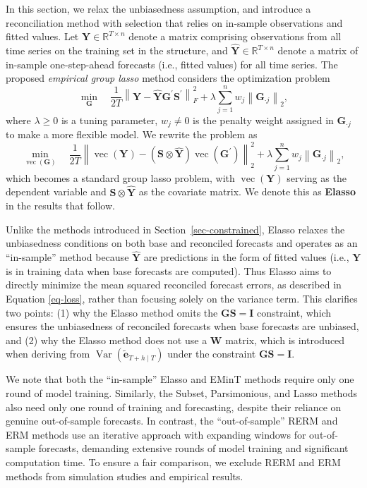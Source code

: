 \documentclass[
  11pt]{article}
\theoremstyle{plain}
\theoremstyle{remark}
\begin{document}
In this section, we relax the unbiasedness assumption, and introduce a
reconciliation method with selection that relies on in-sample
observations and fitted values. Let
\(\bm{Y} \in \mathbb{R}^{T \times n}\) denote a matrix comprising
observations from all time series on the training set in the structure,
and \(\hat{\bm{Y}} \in \mathbb{R}^{T \times n}\) denote a matrix of
in-sample one-step-ahead forecasts (i.e., fitted values) for all time
series. The proposed \emph{empirical group lasso} method considers the
optimization problem \[
\min_{\bm{G}} \quad \frac{1}{2 T} \left\|\bm{Y}-\hat{\bm{Y}} \bm{G}^{\prime} \bm{S}^{\prime}\right\|_F^2 + \lambda \sum_{j=1}^n w_j \left\|\bm{G}_{\cdot j}\right\|_2,
\] where \(\lambda \geq 0\) is a tuning parameter, \(w_j \neq 0\) is the
penalty weight assigned in \(\bm{G}_{\cdot j}\) to make a more flexible
model. We rewrite the problem as \[
\min_{\operatorname{vec}(\bm{G})} \quad \frac{1}{2 T} \left\|\operatorname{vec}(\bm{Y})-(\bm{S} \otimes \hat{\bm{Y}}) \operatorname{vec}\left(\bm{G}^{\prime}\right)\right\|_2^2 + \lambda \sum_{j=1}^n w_j \left\|\bm{G}_{\cdot j}\right\|_2,
\] which becomes a standard group lasso problem, with
\(\operatorname{vec}(\bm{Y})\) serving as the dependent variable and
\(\bm{S} \otimes \hat{\bm{Y}}\) as the covariate matrix. We denote this
as \textbf{Elasso} in the results that follow.

Unlike the methods introduced in Section~\ref{sec-constrained}, Elasso
relaxes the unbiasedness conditions on both base and reconciled
forecasts and operates as an ``in-sample'' method because
\(\hat{\bm{Y}}\) are predictions in the form of fitted values (i.e.,
\(\bm{Y}\) is in training data when base forecasts are computed). Thus
Elasso aims to directly minimize the mean squared reconciled forecast
errors, as described in Equation \eqref{eq-loss}, rather than focusing
solely on the variance term. This clarifies two points: (1) why the
Elasso method omits the \(\bm{GS}=\bm{I}\) constraint, which ensures the
unbiasedness of reconciled forecasts when base forecasts are unbiased,
and (2) why the Elasso method does not use a \(\bm{W}\) matrix, which is
introduced when deriving from
\(\operatorname{Var}(\tilde{\bm{e}}_{T+h \mid T})\) under the constraint
\(\bm{GS}=\bm{I}\).

We note that both the ``in-sample'' Elasso and EMinT methods require
only one round of model training. Similarly, the Subset, Parsimonious,
and Lasso methods also need only one round of training and forecasting,
despite their reliance on genuine out-of-sample forecasts. In contrast,
the ``out-of-sample'' RERM and ERM methods use an iterative approach
with expanding windows for out-of-sample forecasts, demanding extensive
rounds of model training and significant computation time. To ensure a
fair comparison, we exclude RERM and ERM methods from simulation studies
and empirical results.
\end{document}
